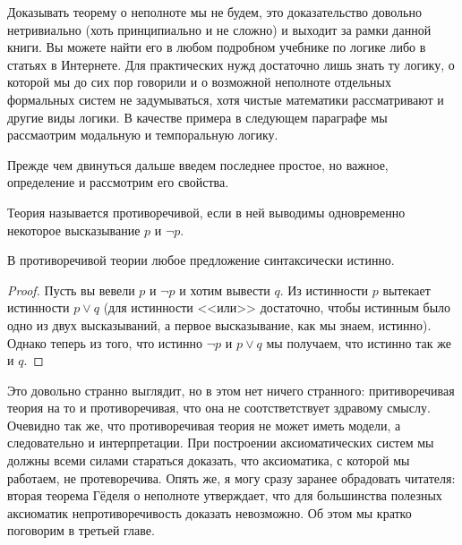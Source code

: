 Доказывать теорему о неполноте мы не будем, это доказательство довольно нетривиально (хоть принципиально и не сложно) и выходит за рамки данной книги. Вы можете найти его в любом подробном учебнике по логике либо в статьях в Интернете. Для практических нужд достаточно лишь знать ту логику, о которой мы до сих пор говорили и о возможной неполноте отдельных формальных систем не задумываться, хотя чистые математики рассматривают и другие виды логики. В качестве примера в следующем параграфе мы рассмаотрим модальную и темпоральную логику.

Прежде чем двинуться дальше введем последнее простое, но важное, определение и рассмотрим его свойства.

\begin{definition}
Теория называется противоречивой, если в ней выводимы одновременно некоторое высказывание $p$ и $\neg p$.
\end{definition}

\begin{thm}
В противоречивой теории любое предложение синтаксически истинно.
\end{thm}
\begin{proof}
Пусть вы вевели $p$ и $\neg p$ и хотим вывести $q$. Из истинности $p$ вытекает истинности $p\lor q$ (для истинности <<или>> достаточно, чтобы истинным было одно из двух высказываний, а первое высказывание, как мы знаем, истинно). Однако теперь из того, что истинно $\neg p$ и $p\lor q$ мы получаем, что истинно так же и $q$.
\end{proof}

Это довольно странно выглядит, но в этом нет ничего странного: притиворечивая теория на то и противоречивая, что она не соотстветствует здравому смыслу. Очевидно так же, что противоречивая теория не может иметь модели, а следовательно и интерпретации. При построении аксиоматических систем мы должны всеми силами стараться доказать, что аксиоматика, с которой мы работаем, не протеворечива. Опять же, я могу сразу заранее обрадовать читателя: вторая теорема Гёделя о неполноте утверждает, что для большинства полезных аксиоматик непротиворечивость доказать невозможно. Об этом мы кратко поговорим в третьей главе.